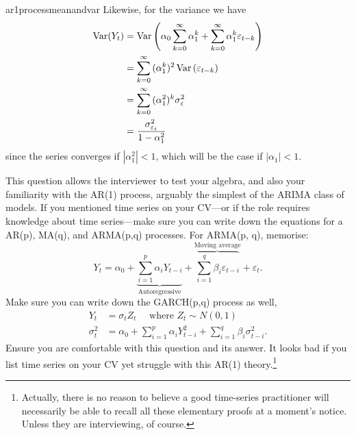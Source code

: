 \begin{answer}{ar1processmeanandvar}
Likewise, for the variance we have
\begin{align*}
\operatorname{\mathrm{Var}}(Y_t)
&=
\operatorname{\mathrm{Var}}\left(
  \alpha_0
  \sum_{k=0}^{\infty}
  {\alpha_1^k}
  +
  \sum_{k=0}^{\infty}{
    \alpha_1^k
    \varepsilon_{t-k}
    }
    \right) \\
&=
  \sum_{k=0}^{\infty}{
    (\alpha_1^k)^2
\operatorname{\mathrm{Var}}\left(
    \varepsilon_{t-k}
    \right)
    } \\
&=
  \sum_{k=0}^{\infty}{
    (\alpha_1^2)^k
    \sigma^2_{\varepsilon}
    } \\
&= \frac{ \sigma^2_{\varepsilon_{t}}}{1- \alpha_1^2}
\end{align*}
since the series converges if
$|\alpha_1^2| < 1$,
which will be the case if
$|\alpha_1| < 1$.

This question allows the interviewer to test your algebra, and also your familiarity with the AR(1) process, arguably the simplest of the ARIMA class of models.
If you mentioned time series on your CV---or if the role requires knowledge about time series---make
sure you can write down the equations for a AR(p),  MA(q), and ARMA(p,q) processes.
For ARMA(p, q), memorise:
\[
 Y_t = \alpha_0 +
 \underbrace{
  \sum_{i=1}^{p}{ \alpha_i Y_{t-i} }
  }_{\text{Autoregressive}}
  +
 \overbrace{
  \sum_{i=1}^{q}{ \beta_i \varepsilon_{t-i} }
  }^{\text{Moving average}}
  + \varepsilon_{t}
  \text{.}
\]
Make sure you can write down the GARCH(p,q) process as well,
\begin{align*}
 Y_t &= \sigma_t Z_t  \quad \text{ where } Z_t \sim N(0,1) \\
 \sigma^2_{t}
 &=
 \alpha_0 +
  \sum_{i=1}^{p}{ \alpha_i Y^2_{t-i} }
  +
  \sum_{i=1}^{q}{ \beta_i \sigma^2_{t-i} }
  \text{.}
\end{align*}
Ensure you are comfortable with this question and its answer.
It looks bad if you list time series on your CV yet struggle with this AR(1) theory.\footnote{Actually, there is no reason to believe a good time-series practitioner will necessarily be able to recall all these elementary proofs at a moment's notice. Unless they are interviewing, of course.}
\end{answer}
